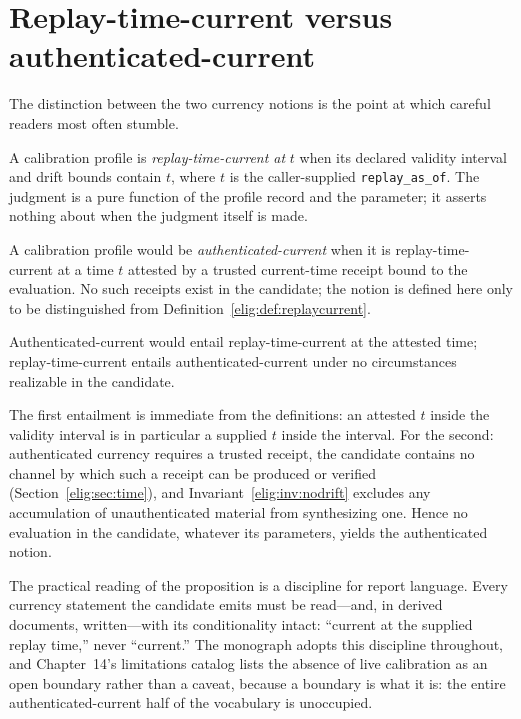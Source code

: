\section{Replay-time-current versus authenticated-current}\label{elig:sec:replaytime}

The distinction between the two currency notions is the point at which careful readers most often stumble.

\begin{definition}\label{elig:def:replaycurrent}
A calibration profile is \emph{replay-time-current at} $t$ when its declared validity interval and drift bounds contain $t$, where $t$ is the caller-supplied \texttt{replay\_as\_of}. The judgment is a pure function of the profile record and the parameter; it asserts nothing about when the judgment itself is made.
\end{definition}

\begin{definition}\label{elig:def:authcurrent}
A calibration profile would be \emph{authenticated-current} when it is replay-time-current at a time $t$ attested by a trusted current-time receipt bound to the evaluation. No such receipts exist in the candidate; the notion is defined here only to be distinguished from Definition~\ref{elig:def:replaycurrent}.
\end{definition}

\begin{proposition}\label{elig:prop:oneway}
Authenticated-current would entail replay-time-current at the attested time; replay-time-current entails authenticated-current under no circumstances realizable in the candidate.
\end{proposition}

\begin{designargument}
The first entailment is immediate from the definitions: an attested $t$ inside the validity interval is in particular a supplied $t$ inside the interval. For the second: authenticated currency requires a trusted receipt, the candidate contains no channel by which such a receipt can be produced or verified (Section~\ref{elig:sec:time}), and Invariant~\ref{elig:inv:nodrift} excludes any accumulation of unauthenticated material from synthesizing one. Hence no evaluation in the candidate, whatever its parameters, yields the authenticated notion.
\end{designargument}

The practical reading of the proposition is a discipline for report language. Every currency statement the candidate emits must be read---and, in derived documents, written---with its conditionality intact: ``current at the supplied replay time,'' never ``current.'' The monograph adopts this discipline throughout, and Chapter~14's limitations catalog lists the absence of live calibration as an open boundary rather than a caveat, because a boundary is what it is: the entire authenticated-current half of the vocabulary is unoccupied.

